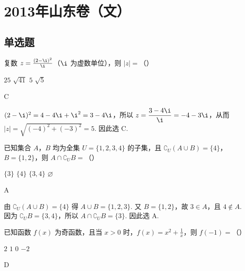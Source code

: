 \chapter{2013年山东卷（文）}

\section{单选题}

\begin{problem}
复数 \(z = \frac{(2 - \i)^2}{\i}\)（\(\i\) 为虚数单位），则 \(|z| =\)（\quad）

\choices
    {\(25\)}
    {\(\sqrt{41}\)}
    {\(5\)}
    {\(\sqrt{5}\)}
\end{problem}

\begin{answer}
C
\end{answer}

\begin{solution}
\((2-\i)^2=4-4\i+\i^2=3-4\i\)，所以 \(z=\dfrac{3-4\i}{\i}=-4-3\i\)，从而 \(|z|=\sqrt{(-4)^2+(-3)^2}=5\). 因此选 C.
\end{solution}

\begin{problem}
已知集合 \(A\)，\(B\) 均为全集 \(U = \{1, 2, 3, 4\}\) 的子集，且 \(\complement_U (A \cup B) = \{4\}\)，\(B = \{1, 2\}\)，则 \(A \cap \complement_U B =\)（\quad）

\choices
    {\(\{3\}\)}
    {\(\{4\}\)}
    {\(\{3, 4\}\)}
    {\(\varnothing\)}
\end{problem}

\begin{answer}
A
\end{answer}

\begin{solution}
由 \(\complement_U(A\cup B)=\{4\}\) 得 \(A\cup B=\{1,2,3\}\). 又 \(B=\{1,2\}\)，故 \(3\in A\)，且 \(4\notin A\). 因为 \(\complement_U B=\{3,4\}\)，所以 \(A\cap\complement_U B=\{3\}\). 因此选 A.
\end{solution}

\begin{problem}
已知函数 \( f(x) \) 为奇函数，且当 \( x > 0 \) 时，\( f(x) = x^2 + \frac{1}{x} \)，则 \( f(-1) =\)（\quad）

\choices
    {\(2\)}
    {\(1\)}
    {\(0\)}
    {\(-2\)}
\end{problem}

\begin{answer}
D
\end{answer}

